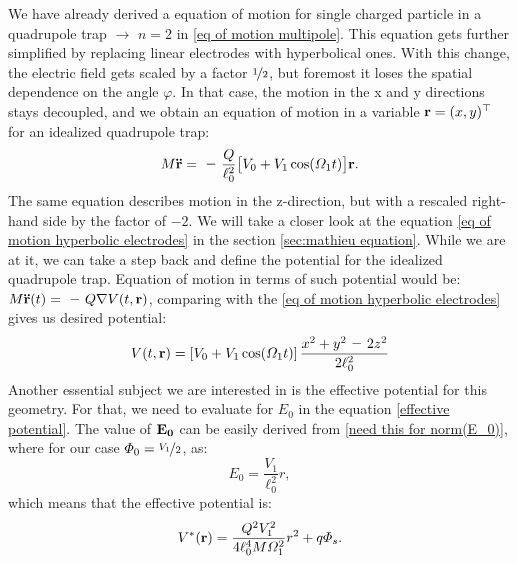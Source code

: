 \label{sec:quadrupole trap}
We have already derived a equation of motion for single charged particle in a quadrupole trap $\rightarrow$ $n=2$ in \eqref{eq of motion multipole}. This equation gets further simplified by replacing linear electrodes with hyperbolical ones. With this change, the electric field gets scaled \cite{leefer2017investigation} by a factor $\nicefrac{1}{2}$, but foremost it loses the spatial dependence on the angle $\varphi$. In that case, the motion in the x and y directions stays decoupled, and we obtain an equation of motion in a variable $\vb{r} = (x,y)^\top$ for an idealized quadrupole trap:
\begin{equation}
	\label{eq of motion hyperbolic electrodes}
	M\vb{\ddot{r}} = \minus\dfrac{Q}{\ell_0^2} \big[V_0 + V_1 \cos(\Omega_1 t)\big] \vb{r}.
\end{equation}
The same equation describes motion in the z-direction, but with a rescaled right-hand side by the factor of $\minus 2$. We will take a closer look at the equation \eqref{eq of motion hyperbolic electrodes} in the section \ref{sec:mathieu equation}. While we are at it, we can take a step back and define the potential for the idealized quadrupole trap. Equation of motion in terms of such potential would be: $M\vb{\ddot{r}}(t) = \minus Q\nabla V(t,\vb{r})$, comparing with the \eqref{eq of motion hyperbolic electrodes} gives us desired potential:
\begin{equation}
	\label{ideal quadrupole potential}
	V(t,\vb{r}) = \left[V_0 + V_1 \cos(\Omega_1 t)\right] \dfrac{x^2+y^2 \minus 2z^2}{2\ell_0^2}
\end{equation}
Another essential subject we are interested in is the effective potential for this geometry. For that, we need to evaluate for $E_0$ in the equation \eqref{effective potential}. The value of $\vb{E_0}$ can be easily derived from \eqref{need this for norm(E_0)}, where for our case $\Phi_0 = \nicefrac{V_1}{2}$, as:
\begin{equation}
	\label{norm(E_0)}
	E_0 = \dfrac{V_1}{\ell_0^2} r,
\end{equation}
which means that the effective potential is:
\begin{equation}
	\label{effective potential hyperbolic}
	V^*(\vb{r}) = \dfrac{Q^2 V_1^2}{4\ell_0^4 M \Omega_1^2} r^2 + q\Phi_s.
\end{equation}

